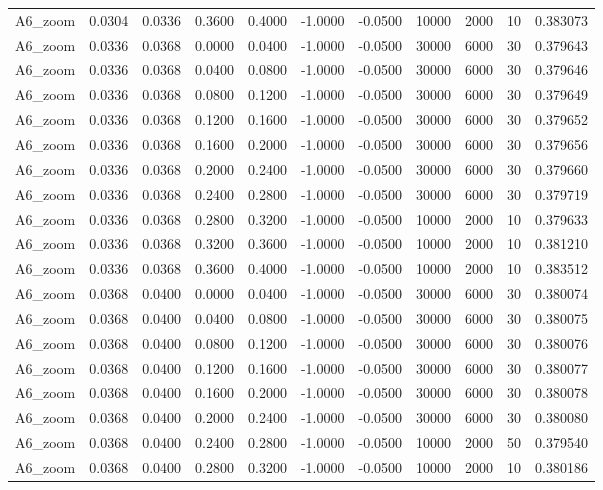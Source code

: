 \documentclass{article}
\begin{document}
\begin{longtable}{l r r r r r r r r r l}
A6_zoom & 0.0304 & 0.0336 & 0.3600 & 0.4000 & -1.0000 & -0.0500 & 10000 & 2000 & 10 & 0.383073 \\
A6_zoom & 0.0336 & 0.0368 & 0.0000 & 0.0400 & -1.0000 & -0.0500 & 30000 & 6000 & 30 & 0.379643 \\
A6_zoom & 0.0336 & 0.0368 & 0.0400 & 0.0800 & -1.0000 & -0.0500 & 30000 & 6000 & 30 & 0.379646 \\
A6_zoom & 0.0336 & 0.0368 & 0.0800 & 0.1200 & -1.0000 & -0.0500 & 30000 & 6000 & 30 & 0.379649 \\
A6_zoom & 0.0336 & 0.0368 & 0.1200 & 0.1600 & -1.0000 & -0.0500 & 30000 & 6000 & 30 & 0.379652 \\
A6_zoom & 0.0336 & 0.0368 & 0.1600 & 0.2000 & -1.0000 & -0.0500 & 30000 & 6000 & 30 & 0.379656 \\
A6_zoom & 0.0336 & 0.0368 & 0.2000 & 0.2400 & -1.0000 & -0.0500 & 30000 & 6000 & 30 & 0.379660 \\
A6_zoom & 0.0336 & 0.0368 & 0.2400 & 0.2800 & -1.0000 & -0.0500 & 30000 & 6000 & 30 & 0.379719 \\
A6_zoom & 0.0336 & 0.0368 & 0.2800 & 0.3200 & -1.0000 & -0.0500 & 10000 & 2000 & 10 & 0.379633 \\
A6_zoom & 0.0336 & 0.0368 & 0.3200 & 0.3600 & -1.0000 & -0.0500 & 10000 & 2000 & 10 & 0.381210 \\
A6_zoom & 0.0336 & 0.0368 & 0.3600 & 0.4000 & -1.0000 & -0.0500 & 10000 & 2000 & 10 & 0.383512 \\
A6_zoom & 0.0368 & 0.0400 & 0.0000 & 0.0400 & -1.0000 & -0.0500 & 30000 & 6000 & 30 & 0.380074 \\
A6_zoom & 0.0368 & 0.0400 & 0.0400 & 0.0800 & -1.0000 & -0.0500 & 30000 & 6000 & 30 & 0.380075 \\
A6_zoom & 0.0368 & 0.0400 & 0.0800 & 0.1200 & -1.0000 & -0.0500 & 30000 & 6000 & 30 & 0.380076 \\
A6_zoom & 0.0368 & 0.0400 & 0.1200 & 0.1600 & -1.0000 & -0.0500 & 30000 & 6000 & 30 & 0.380077 \\
A6_zoom & 0.0368 & 0.0400 & 0.1600 & 0.2000 & -1.0000 & -0.0500 & 30000 & 6000 & 30 & 0.380078 \\
A6_zoom & 0.0368 & 0.0400 & 0.2000 & 0.2400 & -1.0000 & -0.0500 & 30000 & 6000 & 30 & 0.380080 \\
A6_zoom & 0.0368 & 0.0400 & 0.2400 & 0.2800 & -1.0000 & -0.0500 & 10000 & 2000 & 50 & 0.379540 \\
A6_zoom & 0.0368 & 0.0400 & 0.2800 & 0.3200 & -1.0000 & -0.0500 & 10000 & 2000 & 10 & 0.380186 \\

\end{longtable}
\end{document}
